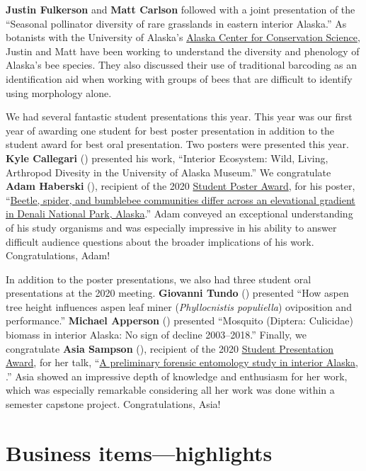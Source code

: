\begin{multicols}{2}
\textbf{Justin Fulkerson} and \textbf{Matt Carlson} followed with a joint presentation of the ``Seasonal pollinator diversity of rare grasslands in eastern interior Alaska.'' As botanists with the University of Alaska’s \href{https://accs.uaa.alaska.edu/}{Alaska Center for Conservation Science}, Justin and Matt have been working to understand the diversity and phenology of Alaska’s bee species. They also discussed their use of traditional barcoding as an identification aid when working with groups of bees that are difficult to identify using morphology alone.

We had several fantastic student presentations this year. This year was our first year of awarding one student for best poster presentation in addition to the student award for best oral presentation. Two posters were presented this year. \textbf{Kyle Callegari} () presented his work, ``Interior Ecosystem: Wild, Living, Arthropod Divesity in the University of Alaska Museum.'' We congratulate \textbf{Adam Haberski} (), recipient of the 2020 \href{http://www.akentsoc.org/student-presentation-award}{Student Poster Award}, for his poster, ``\href{http://www.akentsoc.org/doc/Haberski_A_et_al_2020.pdf}{Beetle, spider, and bumblebee communities differ across an elevational gradient in Denali National Park, Alaska}.'' Adam conveyed an exceptional understanding of his study organisms and was especially impressive in his ability to answer difficult audience questions about the broader implications of his work. Congratulations, Adam!

In addition to the poster presentations, we also had three student oral presentations at the 2020 meeting. \textbf{Giovanni Tundo} () presented ``How aspen tree height influences aspen leaf miner (\textit{Phyllocnistis populiella}) oviposition and performance.'' \textbf{Michael Apperson} () presented ``Mosquito (Diptera: Culicidae) biomass in interior Alaska: No sign of decline 2003--2018.'' Finally, we congratulate \textbf{Asia Sampson} (), recipient of the 2020 \href{http://www.akentsoc.org/student-presentation-award}{Student Presentation Award}, for her talk, ``\href{http://www.akentsoc.org/doc/Sampson_A_2020.pdf}{A preliminary forensic entomology study in interior Alaska, }.'' Asia showed an impressive depth of knowledge and enthusiasm for her work, which was especially remarkable considering all her work was done within a semester capstone project. Congratulations, Asia!
	
\section{Business items---highlights}


\end{multicols}
